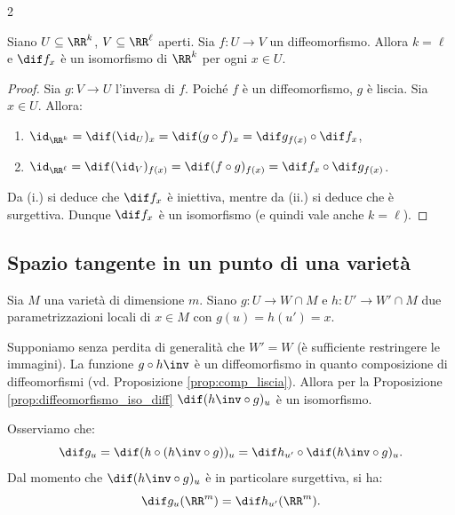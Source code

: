 \begin{multicols*}{2}
    \begin{proposition} \label{prop:diffeomorfismo_iso_diff}
        Siano $U \subseteq \RR^k$, $V \subseteq \RR^\ell$ aperti. Sia $f : U \to V$ un diffeomorfismo.
        Allora $k = \ell$ e $\dif f_x$ è un isomorfismo di $\RR^k$ per ogni $x \in U$.
    \end{proposition}

    \begin{proof}
        Sia $g : V \to U$ l'inversa di $f$. Poiché $f$ è un diffeomorfismo, $g$ è liscia. Sia $x \in U$. Allora:
        \begin{enumerate}[(i.)]
            \item $\id_{\RR^k} = \dif (\id_U)_x = \dif (g \circ f)_x = \dif g_{f(x)} \circ \dif f_x$,
            \item $\id_{\RR^\ell} = \dif (\id_V)_{f(x)} = \dif (f \circ g)_{f(x)} = \dif f_x \circ \dif g_{f(x)}$.
        \end{enumerate}
        Da (i.) si deduce che $\dif f_x$ è iniettiva, mentre da (ii.) si deduce che è surgettiva. Dunque
        $\dif f_x$ è un isomorfismo (e quindi vale anche $k = \ell$).
    \end{proof}

    \subsection{Spazio tangente in un punto di una varietà}

    \begin{remark}
        Sia $M$ una varietà di dimensione $m$. Siano $g : U \to W \cap M$ e
        $h : U' \to W' \cap M$ due parametrizzazioni locali di $x \in M$
        con $g(u) = h(u') = x$. \smallskip

        Supponiamo senza perdita di generalità che $W' = W$ (è sufficiente restringere
        le immagini). La funzione
        $g \circ h\inv$ è un diffeomorfismo in quanto composizione di diffeomorfismi
        (vd. Proposizione \ref{prop:comp_liscia}). Allora per la Proposizione \ref{prop:diffeomorfismo_iso_diff}
        $\dif (h\inv \circ g)_u$ è un isomorfismo. \smallskip

        Osserviamo che:
        \[
            \dif g_u = \dif (h \circ (h\inv \circ g))_u = \dif h_{u'} \circ \dif (h\inv \circ g)_u.
        \]
        Dal momento che $\dif (h\inv \circ g)_u$ è in particolare surgettiva, si ha:
        \[
            \dif g_u(\RR^m) = \dif h_{u'}(\RR^m).
        \]
    \end{remark}


\end{multicols*}
